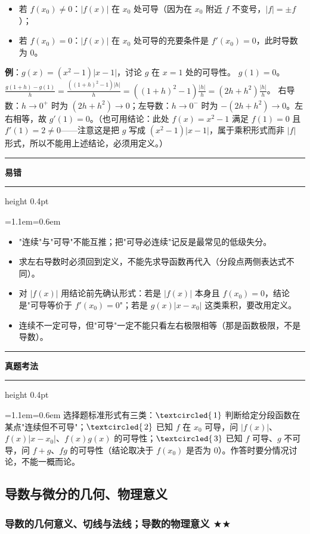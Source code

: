 \documentclass[11pt,openany,UTF8]{ctexbook}
\newcommand{\circled}[1]{\textcircled{\scriptsize\,#1}}
\newcommand{\callouthead}[2]{%
  \par\addvspace{7pt}\noindent
  {\color{#1}\rule[-0.15em]{3pt}{1.05em}}\hspace{0.5em}%
  {\bfseries\color{#1}#2}\par\nobreak\vspace{-0.35em}%
  {\color{rulesep}\hrule height 0.4pt}\nobreak\vspace{0.45em}%
  \begingroup\small\setlength{\parindent}{0pt}%
  \leftskip=1.1em\rightskip=0.6em\noindent\ignorespaces}
\newcommand{\calloutend}{\par\endgroup\addvspace{7pt}}
\newenvironment{callwarn}[1]{\callouthead{warnbar}{#1}}{\calloutend}
\newenvironment{callexam}[1]{\callouthead{exambar}{#1}}{\calloutend}
\begin{document}
\begin{itemize}
\item 若 $f(x_0)\ne 0$：$|f(x)|$ 在 $x_0$ 处可导（因为在 $x_0$ 附近 $f$ 不变号，$|f|=\pm f$）；
\item 若 $f(x_0)=0$：$|f(x)|$ 在 $x_0$ 处可导的充要条件是 $f'(x_0)=0$，此时导数为 $0$。
\end{itemize}
\textbf{例}：$g(x)=(x^2-1)|x-1|$，讨论 $g$ 在 $x=1$ 处的可导性。 $g(1)=0$。$\frac{g(1+h)-g(1)}{h}=\frac{((1+h)^2-1)|h|}{h}=((1+h)^2-1)\frac{|h|}{h}=(2h+h^2)\frac{|h|}{h}$。 右导数：$h\to 0^+$ 时为 $(2h+h^2)\to 0$；左导数：$h\to 0^-$ 时为 $-(2h+h^2)\to 0$。左右相等，故 $g'(1)=0$。（也可用结论：此处 $f(x)=x^2-1$ 满足 $f(1)=0$ 且 $f'(1)=2\ne0$——注意这是把 $g$ 写成 $(x^2-1)\vert x-1\vert$，属于乘积形式而非 $|f|$ 形式，所以不能用上述结论，必须用定义。）

\begin{callwarn}{易错}
\begin{itemize}
\item "连续"与"可导"不能互推；把"可导必连续"记反是最常见的低级失分。
\item 求左右导数时必须回到定义，不能先求导函数再代入（分段点两侧表达式不同）。
\item 对 $|f(x)|$ 用结论前先确认形式：若是 $|f(x)|$ 本身且 $f(x_0)=0$，结论是"可导等价于 $f'(x_0)=0$"；若是 $g(x)|x-x_0|$ 这类乘积，要改用定义。
\item 连续不一定可导，但"可导"一定不能只看左右极限相等（那是函数极限，不是导数）。
\end{itemize}
\end{callwarn}

\begin{callexam}{真题考法}
选择题标准形式有三类：$\circled{1}$ 判断给定分段函数在某点"连续但不可导"；$\circled{2}$ 已知 $f$ 在 $x_0$ 可导，问 $|f(x)|$、$f(x)|x-x_0|$、$f(x)g(x)$ 的可导性；$\circled{3}$ 已知 $f$ 可导、$g$ 不可导，问 $f+g$、$fg$ 的可导性（结论取决于 $f(x_0)$ 是否为 $0$）。作答时要分情况讨论，不能一概而论。

\end{callexam}

\subsection{导数与微分的几何、物理意义}

\subsubsection{导数的几何意义、切线与法线；导数的物理意义 $\bigstar$$\bigstar$}
\end{document}
